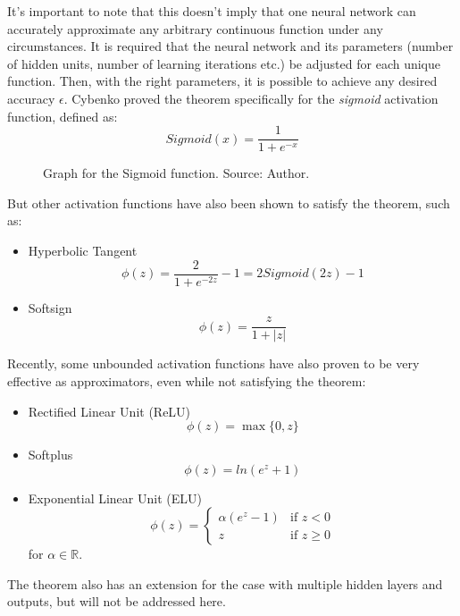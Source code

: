 It's important to note that this doesn't imply that one neural network can accurately approximate any arbitrary continuous function under any circumstances. It is required that the neural network and its parameters (number of hidden units, number of learning iterations etc.) be adjusted for each unique function. Then, with the right parameters, it is possible to achieve any desired accuracy $\epsilon$.
Cybenko proved the theorem specifically for the \textit{sigmoid} activation function, defined as:
\[Sigmoid(x)=\dfrac{1}{1+e^{-x}}\]
\begin{figure}[H]
\caption{Graph for the Sigmoid function. Source: Author.}
\end{figure}
But other activation functions have also been shown to satisfy the theorem, such as:
\begin{itemize}
    \item Hyperbolic Tangent
    \[
        \phi(z) = \frac{2}{1+e^{-2z}}-1 = 2Sigmoid(2z) - 1    
    \]
    \item Softsign
    \[
        \phi(z) = \frac{z}{1+|z|}
    \]
\end{itemize}
Recently, some unbounded activation functions have also proven to be very effective as approximators, even while not satisfying the theorem:
\begin{itemize}
    \item Rectified Linear Unit (ReLU)
    \[
        \phi(z) = \max\{0, z\}    
    \]
    \item Softplus
    \[
        \phi(z) = ln(e^z+1)
    \]
    \item Exponential Linear Unit (ELU)
    \begin{equation*}
        \phi(z)=
            \begin{cases}
                \alpha(e^z-1) & \text{if } z < 0 \\
                z & \text{if } z \geq 0
            \end{cases}
    \end{equation*}
    for $\alpha \in \mathbb{R}$.
\end{itemize}
The theorem also has an extension for the case with multiple hidden layers and outputs, but will not be addressed here.